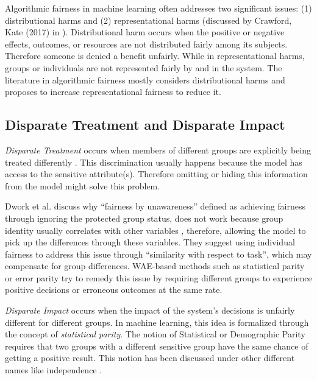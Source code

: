         Algorithmic fairness in machine learning often addresses two significant issues: (1) distributional harms and (2) representational harms (discussed by Crawford, Kate (2017) in \cite{crawford2017trouble}). Distributional harm occurs when the positive or negative effects, outcomes, or resources are not distributed fairly among its subjects. Therefore someone is denied a benefit unfairly. While in representational harms, groups or individuals are not represented fairly by and in the system. The literature in algorithmic fairness mostly considers distributional harms and proposes to increase representational fairness to reduce it.
    
    \subsection{Disparate Treatment and Disparate Impact}
        
        \textit{Disparate Treatment} occurs when members of different groups are explicitly being treated differently \cite{barocas2016big}. This discrimination usually happens because the model has access to the sensitive attribute(s). Therefore omitting or hiding this information from the model might solve this problem.
        
        Dwork et al. \cite{Dwork2012individual} discuss why ``fairness by unawareness'' defined as achieving fairness through ignoring the protected group status, does not work because group identity usually correlates with other variables \cite{Feldman2015}, therefore, allowing the model to pick up the differences through these variables. They suggest using individual fairness to address this issue through ``similarity with respect to task'', which may compensate for group differences. WAE-based methods such as statistical parity or error parity try to remedy this issue by requiring different groups to experience positive decisions or erroneous outcomes at the same rate.
        
        \textit{Disparate Impact} \cite{Feldman2015} occurs when the impact of the system's decisions is unfairly different for different groups. In machine learning, this idea is formalized through the concept of \textit{statistical parity}. The notion of Statistical or Demographic Parity requires that two groups with a different sensitive group have the same chance of getting a positive result. This notion has been discussed under other different names like independence \cite{barocas2018fairness}. 
        
